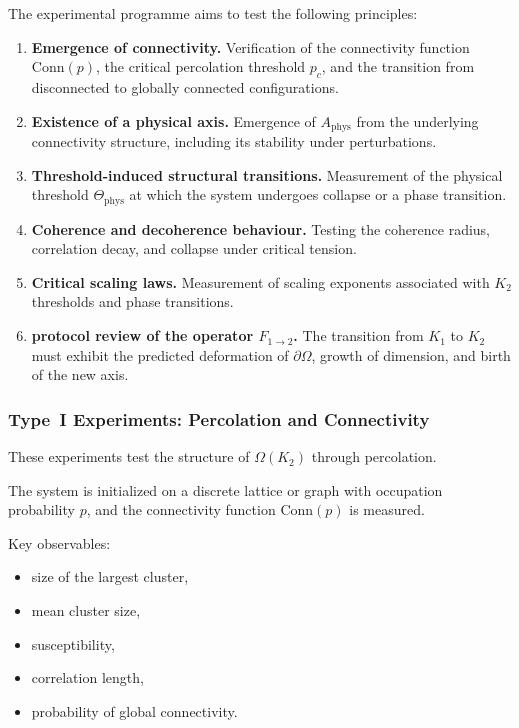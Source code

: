 The experimental programme aims to test the following principles:

\begin{enumerate}
    \item \textbf{Emergence of connectivity.}
          Verification of the connectivity function $\mathrm{Conn}(p)$,
          the critical percolation threshold $p_c$, and the transition
          from disconnected to globally connected configurations.

    \item \textbf{Existence of a physical axis.}
          Emergence of $A_{\mathrm{phys}}$ from the underlying
          connectivity structure, including its stability under perturbations.

    \item \textbf{Threshold-induced structural transitions.}
          Measurement of the physical threshold $\Theta_{\mathrm{phys}}$
          at which the system undergoes collapse or a phase transition.

    \item \textbf{Coherence and decoherence behaviour.}
          Testing the coherence radius, correlation decay, and collapse
          under critical tension.

    \item \textbf{Critical scaling laws.}
          Measurement of scaling exponents associated with $K_2$ thresholds
          and phase transitions.

    \item \textbf{protocol review of the operator $F_{1 \rightarrow 2}$.}
          The transition from $K_1$ to $K_2$ must exhibit the predicted
          deformation of $\partial\Omega$, growth of dimension, and
          birth of the new axis.
\end{enumerate}



\subsubsection{Type~I Experiments: Percolation and Connectivity}

These experiments test the structure of $\Omega(K_2)$ through percolation.

The system is initialized on a discrete lattice or graph with occupation
probability $p$, and the connectivity function $\mathrm{Conn}(p)$ is measured.

Key observables:

\begin{itemize}
    \item size of the largest cluster,
    \item mean cluster size,
    \item susceptibility,
    \item correlation length,
    \item probability of global connectivity.
\end{itemize}

